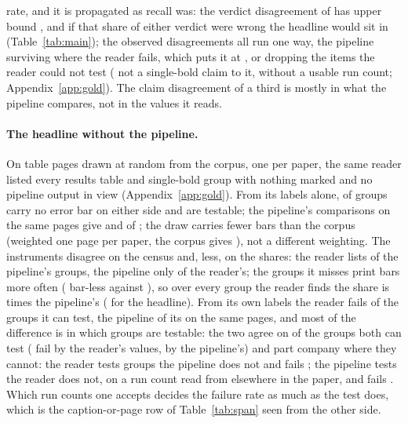 \documentclass{article}
\begin{document}
rate, and it is propagated as recall was: the verdict disagreement of
\nVerdictDisagreementsFrac{} has upper bound \nVerdictErrorUpper{}, and if
that share of either verdict were wrong the headline would sit in
\nFailInstrumentBand{} (Table~\ref{tab:main}); the observed disagreements all
run one way, the pipeline surviving where the reader fails, which puts it at
\nFailInstrumentPoint{}, or \nFailReaderTestableScaled{} dropping the
\nFrozenUntestableN{} items the reader could not test (\nFrozenNotClaimN{}
not a single-bold claim to it, \nFrozenNoUsableN{} without a usable run
count; Appendix~\ref{app:gold}). The
claim disagreement of a third is mostly in what the pipeline compares, not in
the values it reads.

\paragraph{The headline without the pipeline.} On \nPagesN{} table pages drawn
at random from the corpus, one per paper, the same reader listed every
results table and single-bold group with nothing marked and no pipeline output
in view (Appendix~\ref{app:gold}). From its labels alone,
\nPagesReaderNeither{} of \nPagesReaderGroups{} groups carry no error bar on
either side and \nPagesReaderTestable{} are testable; the pipeline's
comparisons on the same pages give \nPagesPipeNeither{} and
\nPagesPipeTestable{} of \nPagesPipeGroups{}; the draw carries fewer bars
than the corpus (weighted one page per paper, the corpus gives
\nPagesCorpusPaperWeightedNeither{}), not a different weighting. The
instruments disagree on the census and, less, on the shares: the reader lists
\nPagesPipeFoundPct{} of the pipeline's groups, the pipeline only
\nPagesReaderFoundPct{} of the reader's; the groups it misses print bars
more often (\nPagesUnmatchedNeither{} bar-less against
\nPagesMatchedNeither{}), so over every group the reader finds the share is
\nPagesCensusRatio{} times the pipeline's (\nNeitherCensusScaled{} for the
headline). From its own labels the reader fails \nPagesReaderFail{} of the
\nPagesReaderTestableGroups{} groups it can test, the pipeline
\nPagesPipeFail{} of its \nPagesPipeTestableN{} on the same pages, and most
of the difference is in which groups are testable: the two agree on
\nPagesSharedAgree{} of the \nPagesSharedN{} groups both can test
(\nPagesSharedReaderFails{} fail by the reader's values,
\nPagesSharedPipeFails{} by the pipeline's) and part company where they
cannot: the reader tests \nPagesReaderOnlyN{} groups the pipeline does not
and fails \nPagesReaderOnlyFails{}; the pipeline tests \nPagesPipeOnlyN{} the
reader does not, on a run count read from elsewhere in the paper, and fails
\nPagesPipeOnlyFails{}. Which run counts one accepts decides the failure rate
as much as the test does, which is the caption-or-page row of
Table~\ref{tab:span} seen from the other side.
\end{document}
